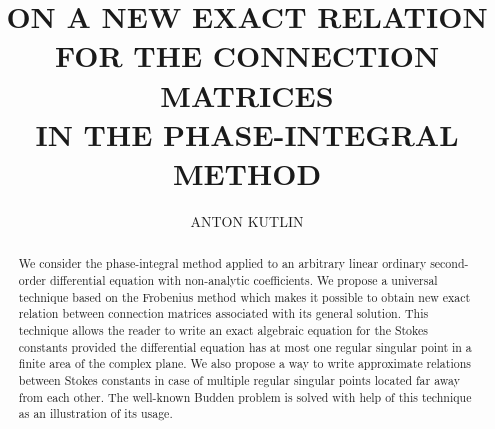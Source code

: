 \documentclass{ws-m3as}
\begin{document}

%
\catchline{}{}{}{}{}
%

\title{ON A NEW EXACT RELATION \\ FOR THE CONNECTION MATRICES \\ IN THE PHASE-INTEGRAL METHOD}
\author{ANTON KUTLIN}

\address{Institute of Applied Physics of Russian Academy of Sciences, \\
Nizhny Novgorod 603950, Russia
\\ anton.kutlin@gmail.com}

\maketitle


\begin{abstract}
We consider the phase-integral method applied to an arbitrary linear ordinary second-order differential 
equation with non-analytic coefficients. We propose a universal technique based on the Frobenius method 
which makes it possible to obtain new exact relation between connection matrices associated with its general solution.
This technique allows the reader to write an exact algebraic equation for the Stokes constants provided 
the differential equation has at most one regular singular point in a finite area of the complex plane. 
We also propose a way to write approximate relations between Stokes constants in case of multiple regular 
singular points located far away from each other. The well-known Budden problem is solved with help of this 
technique as an illustration of its usage.
\end{abstract}


\end{document}
